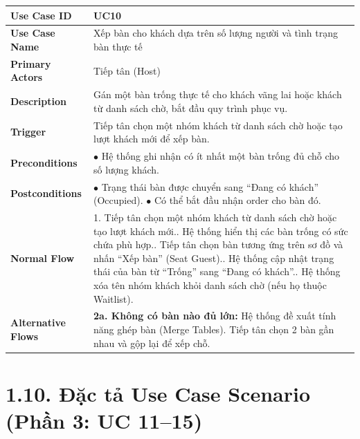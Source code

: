 \begin{longtable}{|L{3.5cm}|L{12.5cm}|}
\hline
\textbf{Use Case ID} & UC10 \\ \hline
\textbf{Use Case Name} & Xếp bàn cho khách dựa trên số lượng người và tình trạng bàn thực tế \\ \hline
\textbf{Primary Actors} & Tiếp tân (Host) \\ \hline
\textbf{Description} & Gán một bàn trống thực tế cho khách vãng lai hoặc khách từ danh sách chờ, bắt đầu quy trình phục vụ. \\ \hline
\textbf{Trigger} & Tiếp tân chọn một nhóm khách từ danh sách chờ hoặc tạo lượt khách mới để xếp bàn. \\ \hline
\textbf{Preconditions} & $\bullet$ Hệ thống ghi nhận có ít nhất một bàn trống đủ chỗ cho số lượng khách. \\ \hline
\textbf{Postconditions} &
$\bullet$ Trạng thái bàn được chuyển sang ``Đang có khách'' (Occupied).\newline
$\bullet$ Có thể bắt đầu nhận order cho bàn đó. \\ \hline
\textbf{Normal Flow} &
1. Tiếp tân chọn một nhóm khách từ danh sách chờ hoặc tạo lượt khách mới.. Hệ thống hiển thị các bàn trống có sức chứa phù hợp.. Tiếp tân chọn bàn tương ứng trên sơ đồ và nhấn ``Xếp bàn'' (Seat Guest).. Hệ thống cập nhật trạng thái của bàn từ ``Trống'' sang ``Đang có khách''.. Hệ thống xóa tên nhóm khách khỏi danh sách chờ (nếu họ thuộc Waitlist). \\ \hline
\textbf{Alternative Flows} &
\textbf{2a. Không có bàn nào đủ lớn:} Hệ thống đề xuất tính năng ghép bàn (Merge Tables). Tiếp tân chọn 2 bàn gần nhau và gộp lại để xếp chỗ. \\ \hline
\end{longtable}

\section*{1.10. Đặc tả Use Case Scenario (Phần 3: UC 11--15)}

